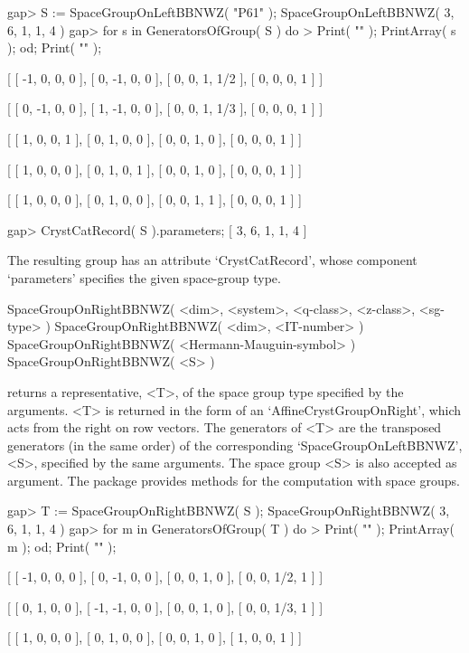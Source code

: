 \beginexample
gap> S := SpaceGroupOnLeftBBNWZ( "P61" );
SpaceGroupOnLeftBBNWZ( 3, 6, 1, 1, 4 )
gap> for s in GeneratorsOfGroup( S ) do
>  Print( "\n" ); PrintArray( s ); od; Print( "\n" );

[ [   -1,    0,    0,    0 ],
  [    0,   -1,    0,    0 ],
  [    0,    0,    1,  1/2 ],
  [    0,    0,    0,    1 ] ]

[ [    0,   -1,    0,    0 ],
  [    1,   -1,    0,    0 ],
  [    0,    0,    1,  1/3 ],
  [    0,    0,    0,    1 ] ]

[ [  1,  0,  0,  1 ],
  [  0,  1,  0,  0 ],
  [  0,  0,  1,  0 ],
  [  0,  0,  0,  1 ] ]

[ [  1,  0,  0,  0 ],
  [  0,  1,  0,  1 ],
  [  0,  0,  1,  0 ],
  [  0,  0,  0,  1 ] ]

[ [  1,  0,  0,  0 ],
  [  0,  1,  0,  0 ],
  [  0,  0,  1,  1 ],
  [  0,  0,  0,  1 ] ]

gap> CrystCatRecord( S ).parameters;
[ 3, 6, 1, 1, 4 ]
\endexample

The resulting group has an attribute `CrystCatRecord', whose component
`parameters' specifies the given space-group type.

\>SpaceGroupOnRightBBNWZ( <dim>, <system>, <q-class>, <z-class>, <sg-type> )
\>SpaceGroupOnRightBBNWZ( <dim>, <IT-number> )
\>SpaceGroupOnRightBBNWZ( <Hermann-Mauguin-symbol> )
\>SpaceGroupOnRightBBNWZ( <S> )

returns a representative, <T>, of the space group type specified by 
the arguments. <T> is returned in the form of an `AffineCrystGroupOnRight',
which acts from the right on row vectors. The generators of <T> are the 
transposed generators (in the same order) of the corresponding 
`SpaceGroupOnLeftBBNWZ', <S>, specified by the same arguments.
The space group <S> is also accepted as argument. The package
{\Cryst} provides methods for the computation with space groups.

\beginexample
gap> T := SpaceGroupOnRightBBNWZ( S );
SpaceGroupOnRightBBNWZ( 3, 6, 1, 1, 4 )
gap> for m in GeneratorsOfGroup( T ) do
>  Print( "\n" ); PrintArray( m ); od; Print( "\n" );

[ [   -1,    0,    0,    0 ],
  [    0,   -1,    0,    0 ],
  [    0,    0,    1,    0 ],
  [    0,    0,  1/2,    1 ] ]

[ [    0,    1,    0,    0 ],
  [   -1,   -1,    0,    0 ],
  [    0,    0,    1,    0 ],
  [    0,    0,  1/3,    1 ] ]

[ [  1,  0,  0,  0 ],
  [  0,  1,  0,  0 ],
  [  0,  0,  1,  0 ],
  [  1,  0,  0,  1 ] ]

